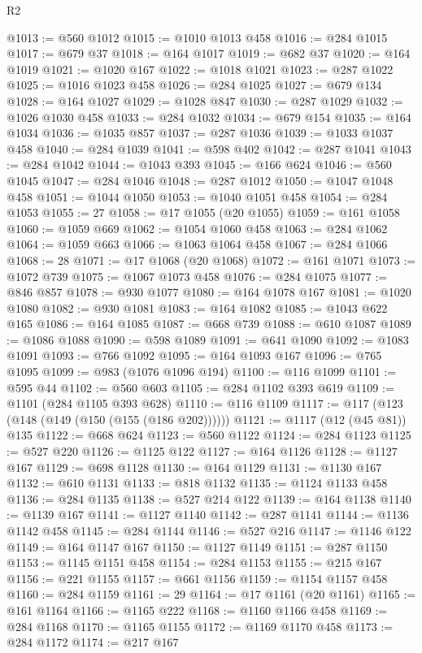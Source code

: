 \begin{lexlean}{R2}
\begin{coremodule}
@1013 := @560 @1012
@1015 := @1010 @1013 @458
@1016 := @284 @1015
@1017 := @679 @37
@1018 := @164 @1017
@1019 := @682 @37
@1020 := @164 @1019
@1021 := @1020 @167
@1022 := @1018 @1021
@1023 := @287 @1022
@1025 := @1016 @1023 @458
@1026 := @284 @1025
@1027 := @679 @134
@1028 := @164 @1027
@1029 := @1028 @847
@1030 := @287 @1029
@1032 := @1026 @1030 @458
@1033 := @284 @1032
@1034 := @679 @154
@1035 := @164 @1034
@1036 := @1035 @857
@1037 := @287 @1036
@1039 := @1033 @1037 @458
@1040 := @284 @1039
@1041 := @598 @402
@1042 := @287 @1041
@1043 := @284 @1042
@1044 := @1043 @393
@1045 := @166 @624
@1046 := @560 @1045
@1047 := @284 @1046
@1048 := @287 @1012
@1050 := @1047 @1048 @458
@1051 := @1044 @1050
@1053 := @1040 @1051 @458
@1054 := @284 @1053
@1055 := 27
@1058 := @17 @1055 (@20 @1055)
@1059 := @161 @1058
@1060 := @1059 @669
@1062 := @1054 @1060 @458
@1063 := @284 @1062
@1064 := @1059 @663
@1066 := @1063 @1064 @458
@1067 := @284 @1066
@1068 := 28
@1071 := @17 @1068 (@20 @1068)
@1072 := @161 @1071
@1073 := @1072 @739
@1075 := @1067 @1073 @458
@1076 := @284 @1075
@1077 := @846 @857
@1078 := @930 @1077
@1080 := @164 @1078 @167
@1081 := @1020 @1080
@1082 := @930 @1081
@1083 := @164 @1082
@1085 := @1043 @622 @165
@1086 := @164 @1085
@1087 := @668 @739
@1088 := @610 @1087
@1089 := @1086 @1088
@1090 := @598 @1089
@1091 := @641 @1090
@1092 := @1083 @1091
@1093 := @766 @1092
@1095 := @164 @1093 @167
@1096 := @765 @1095
@1099 := @983 (@1076 @1096 @194)
@1100 := @116 @1099
@1101 := @595 @44
@1102 := @560 @603
@1105 := @284 @1102 @393 @619
@1109 := @1101 (@284 @1105 @393 @628)
@1110 := @116 @1109
@1117 := @117 (@123 (@148 (@149 (@150 (@155 (@186 @202))))))
@1121 := @1117 (@12 (@45 @81)) @135
@1122 := @668 @624
@1123 := @560 @1122
@1124 := @284 @1123
@1125 := @527 @220
@1126 := @1125 @122
@1127 := @164 @1126
@1128 := @1127 @167
@1129 := @698 @1128
@1130 := @164 @1129
@1131 := @1130 @167
@1132 := @610 @1131
@1133 := @818 @1132
@1135 := @1124 @1133 @458
@1136 := @284 @1135
@1138 := @527 @214 @122
@1139 := @164 @1138
@1140 := @1139 @167
@1141 := @1127 @1140
@1142 := @287 @1141
@1144 := @1136 @1142 @458
@1145 := @284 @1144
@1146 := @527 @216
@1147 := @1146 @122
@1149 := @164 @1147 @167
@1150 := @1127 @1149
@1151 := @287 @1150
@1153 := @1145 @1151 @458
@1154 := @284 @1153
@1155 := @215 @167
@1156 := @221 @1155
@1157 := @661 @1156
@1159 := @1154 @1157 @458
@1160 := @284 @1159
@1161 := 29
@1164 := @17 @1161 (@20 @1161)
@1165 := @161 @1164
@1166 := @1165 @222
@1168 := @1160 @1166 @458
@1169 := @284 @1168
@1170 := @1165 @1155
@1172 := @1169 @1170 @458
@1173 := @284 @1172
@1174 := @217 @167

\end{coremodule}
\end{lexlean}
